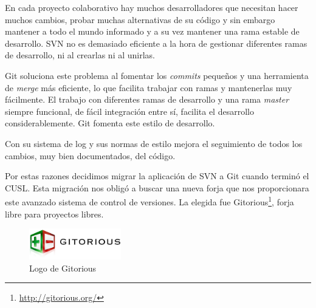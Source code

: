 En cada proyecto colaborativo hay muchos desarrolladores que necesitan hacer
muchos cambios, probar muchas alternativas de su código y sin embargo mantener
a todo el mundo informado y a su vez mantener una rama estable de desarrollo.
SVN no es demasiado eficiente a la hora de gestionar diferentes ramas de
desarrollo, ni al crearlas ni al unirlas.

Git soluciona este problema al fomentar los {\em commits} pequeños y una
herramienta de {\em merge} más eficiente, lo que facilita trabajar con ramas y
mantenerlas muy fácilmente. El trabajo con diferentes ramas de desarrollo y
una rama {\em master} siempre funcional, de fácil integración entre sí, facilita
el desarrollo considerablemente. Git fomenta este estilo de desarrollo.

Con su sistema de log y sus normas de estilo mejora el seguimiento de todos los
cambios, muy bien documentados, del código.

Por estas razones decidimos migrar la aplicación de SVN a Git cuando terminó el
CUSL. Esta migración nos obligó a buscar una nueva forja que nos proporcionara
este avanzado sistema de control de versiones. La elegida fue
Gitorious\footnote{\url{http://gitorious.org/}}, forja libre para proyectos
libres.

\begin{figure}[H]
 \centering
 \includegraphics[width=40mm]{figuras/cap5/gitorious.png}
 \caption{Logo de Gitorious}
\end{figure}

